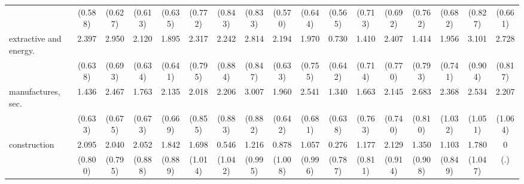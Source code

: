 {\begin{tabular}{l*{16}{c}}
                    &     (0.588)         &     (0.627)         &     (0.613)         &     (0.635)         &     (0.772)         &     (0.843)         &     (0.833)         &     (0.570)         &     (0.644)         &     (0.565)         &     (0.713)         &     (0.692)         &     (0.762)         &     (0.682)         &     (0.827)         &     (0.661)         \\
[1em]
extractive and energy.&       2.397\sym{***}&       2.950\sym{***}&       2.120\sym{***}&       1.895\sym{**} &       2.317\sym{**} &       2.242\sym{*}  &       2.814\sym{***}&       2.194\sym{***}&       1.970\sym{**} &       0.730         &       1.410\sym{*}  &       2.407\sym{**} &       1.414         &       1.956\sym{**} &       3.101\sym{***}&       2.728\sym{***}\\
                    &     (0.638)         &     (0.693)         &     (0.634)         &     (0.641)         &     (0.795)         &     (0.884)         &     (0.847)         &     (0.633)         &     (0.755)         &     (0.642)         &     (0.714)         &     (0.770)         &     (0.793)         &     (0.741)         &     (0.904)         &     (0.817)         \\
[1em]
manufactures, sec.  &       1.436\sym{*}  &       2.467\sym{***}&       1.763\sym{**} &       2.135\sym{**} &       2.018\sym{*}  &       2.206\sym{*}  &       3.007\sym{***}&       1.960\sym{**} &       2.541\sym{***}&       1.340\sym{*}  &       1.663\sym{*}  &       2.145\sym{**} &       2.683\sym{***}&       2.368\sym{*}  &       2.534\sym{*}  &       2.207\sym{*}  \\
                    &     (0.633)         &     (0.675)         &     (0.673)         &     (0.669)         &     (0.855)         &     (0.883)         &     (0.882)         &     (0.642)         &     (0.681)         &     (0.638)         &     (0.763)         &     (0.740)         &     (0.810)         &     (1.032)         &     (1.051)         &     (1.064)         \\
[1em]
construction        &       2.095\sym{**} &       2.040\sym{*}  &       2.052\sym{*}  &       1.842\sym{*}  &       1.698         &       0.546         &       1.216         &       0.878         &       1.057         &       0.276         &       1.177         &       2.129\sym{*}  &       1.350         &       1.103         &       1.780         &           0         \\
                    &     (0.800)         &     (0.795)         &     (0.888)         &     (0.889)         &     (1.014)         &     (1.042)         &     (0.995)         &     (1.008)         &     (0.996)         &     (0.787)         &     (0.811)         &     (0.914)         &     (0.908)         &     (0.849)         &     (1.047)         &         (.)         \\

\end{tabular}}
